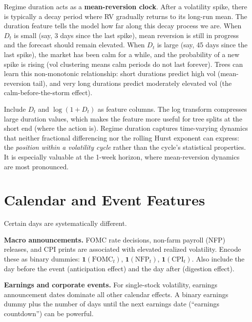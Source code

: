 \begin{intuition}
Regime duration acts as a \textbf{mean-reversion clock}.
After a volatility spike, there is typically a decay period where RV gradually returns to its long-run mean.
The duration feature tells the model how far along this decay process we are.
When $D_t$ is small (say, 3 days since the last spike), mean reversion is still in progress and the forecast should remain elevated.
When $D_t$ is large (say, 45 days since the last spike), the market has been calm for a while, and the probability of a new spike is rising (vol clustering means calm periods do not last forever).
Trees can learn this non-monotonic relationship: short durations predict high vol (mean-reversion tail), and very long durations predict moderately elevated vol (the calm-before-the-storm effect).
\end{intuition}

\begin{projectconnection}
Include $D_t$ and $\log(1 + D_t)$ as feature columns.
The log transform compresses large duration values, which makes the feature more useful for tree splits at the short end (where the action is).
Regime duration captures time-varying dynamics that neither fractional differencing nor the rolling Hurst exponent can express: the \emph{position within a volatility cycle} rather than the cycle's statistical properties.
It is especially valuable at the 1-week horizon, where mean-reversion dynamics are most pronounced.
\end{projectconnection}

\section{Calendar and Event Features}\label{sec:feat-calendar}

Certain days are systematically different.

\textbf{Macro announcements.}
FOMC rate decisions, non-farm payroll (NFP) releases, and CPI prints are associated with elevated realized volatility.
Encode these as binary dummies: $\mathbf{1}(\text{FOMC}_t)$, $\mathbf{1}(\text{NFP}_t)$, $\mathbf{1}(\text{CPI}_t)$.
Also include the day before the event (anticipation effect) and the day after (digestion effect).

\textbf{Earnings and corporate events.}
For single-stock volatility, earnings announcement dates dominate all other calendar effects.
A binary earnings dummy plus the number of days until the next earnings date (``earnings countdown'') can be powerful.

